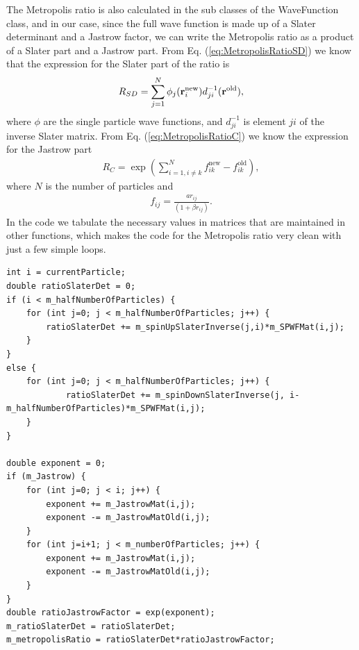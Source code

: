 \documentclass[../main.tex]{subfiles}
\begin{document}
The Metropolis ratio is also calculated in the sub classes of the WaveFunction class, and in our case, since the full wave function is made up of a Slater determinant and a Jastrow factor, we can write the Metropolis ratio as a product of a Slater part and a Jastrow part. From Eq. (\ref{eq:MetropolisRatioSD}) we know that the expression for the Slater part of the ratio is
\begin{align}
    R_{SD} = \sum_{j=1}^N \phi_j({\bf r}_i^{\textrm{new}}) d_{ji}^{-1}({\bf r}^{\textrm{old}}),
\end{align}
where $\phi$ are the single particle wave functions, and $d_{ji}^{-1}$ is element $ji$ of the inverse Slater matrix. From Eq. (\ref{eq:MetropolisRatioC}) we know the expression for the Jastrow part
\begin{align}
    R_{C} = \exp\left(\sum_{i=1, i\neq k}^{N} f_{ik}^{\textrm{new}} - f_{ik}^{\textrm{old}}\right),
\end{align}
where $N$ is the number of particles and
\begin{align}
    f_{ij} = \frac{a r_{ij}}{(1+\beta r_{ij})}.
\end{align}
In the code we tabulate the necessary values in matrices that are maintained in other functions, which makes the code for the Metropolis ratio very clean with just a few simple loops.
\lstset{language=c++}
\begin{lstlisting}[caption={The computation of the Metropolis ratio when the full wave function consists of a Slater determinant and a Jastrow factor. The ratio can be split into a Slater part and a Jastrow part which are multiplied together to form the full ratio. The "m\_spinUpSlaterInverse" matrix is the inverse of the spin up Slater matrix, and similarly for the spin down matrix, while "m\_SPWFMat" is a matrix containing the single particle wave functions, i.e. it is the spin up and spin down Slater matrices stored together in one matrix. The "m\_JastrowMat" matrix contains the exponent of the Jastrow factor for all particle pairs for the trial state, while the "m\_JastrowMat" is the same matrix, but for the last accepted state (i.e. the state before the trial state).}]
int i = currentParticle;
double ratioSlaterDet = 0;
if (i < m_halfNumberOfParticles) {
    for (int j=0; j < m_halfNumberOfParticles; j++) {
        ratioSlaterDet += m_spinUpSlaterInverse(j,i)*m_SPWFMat(i,j);
    }
}
else {
    for (int j=0; j < m_halfNumberOfParticles; j++) {
            ratioSlaterDet += m_spinDownSlaterInverse(j, i-m_halfNumberOfParticles)*m_SPWFMat(i,j);
    }
}

double exponent = 0;
if (m_Jastrow) {
    for (int j=0; j < i; j++) {
        exponent += m_JastrowMat(i,j);
        exponent -= m_JastrowMatOld(i,j);
    }
    for (int j=i+1; j < m_numberOfParticles; j++) {
        exponent += m_JastrowMat(i,j);
        exponent -= m_JastrowMatOld(i,j);
    }
}
double ratioJastrowFactor = exp(exponent);
m_ratioSlaterDet = ratioSlaterDet;
m_metropolisRatio = ratioSlaterDet*ratioJastrowFactor;
\end{lstlisting}
\end{document}
